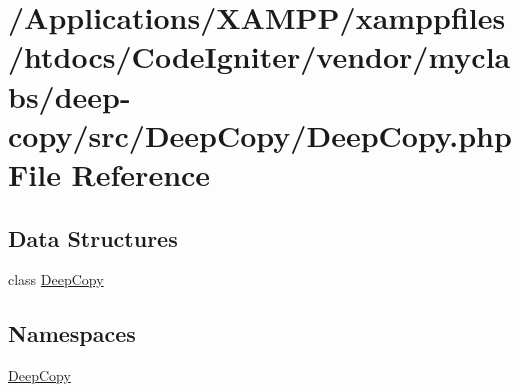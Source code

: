 \hypertarget{_deep_copy_8php}{}\section{/\+Applications/\+X\+A\+M\+P\+P/xamppfiles/htdocs/\+Code\+Igniter/vendor/myclabs/deep-\/copy/src/\+Deep\+Copy/\+Deep\+Copy.php File Reference}
\label{_deep_copy_8php}
\subsection*{Data Structures}
\begin{DoxyCompactItemize}
\item 
class \mbox{\hyperlink{class_deep_copy_1_1_deep_copy}{Deep\+Copy}}
\end{DoxyCompactItemize}
\subsection*{Namespaces}
\begin{DoxyCompactItemize}
\item 
 \mbox{\hyperlink{namespace_deep_copy}{Deep\+Copy}}
\end{DoxyCompactItemize}
